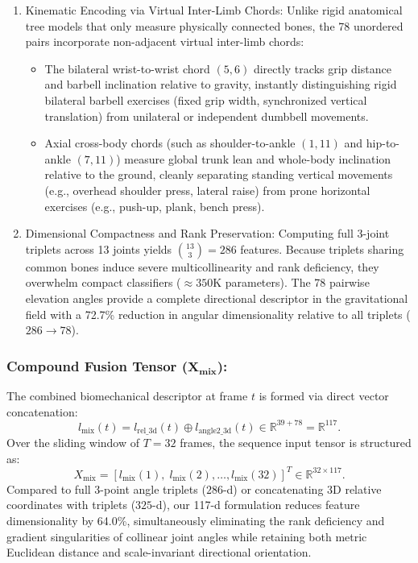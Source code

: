\documentclass[preprint,12pt]{elsarticle}
\begin{document}
\begin{enumerate}
    \item Kinematic Encoding via Virtual Inter-Limb Chords: 
    Unlike rigid anatomical tree models that only measure physically connected bones, the 78 unordered pairs incorporate non-adjacent virtual inter-limb chords:
    \begin{itemize}
        \item The bilateral wrist-to-wrist chord $(5, 6)$ directly tracks grip distance and barbell inclination relative to gravity, instantly distinguishing rigid bilateral barbell exercises (fixed grip width, synchronized vertical translation) from unilateral or independent dumbbell movements.
        \item Axial cross-body chords (such as shoulder-to-ankle $(1, 11)$ and hip-to-ankle $(7, 11)$) measure global trunk lean and whole-body inclination relative to the ground, cleanly separating standing vertical movements (e.g., overhead shoulder press, lateral raise) from prone horizontal exercises (e.g., push-up, plank, bench press).
    \end{itemize}

    \item Dimensional Compactness and Rank Preservation: Computing full 3-joint triplets across 13 joints yields $\binom{13}{3} = 286$ features. Because triplets sharing common bones induce severe multicollinearity and rank deficiency, they overwhelm compact classifiers ($\approx 350\text{K}$ parameters). The 78 pairwise elevation angles provide a complete directional descriptor in the gravitational field with a 72.7\% reduction in angular dimensionality relative to all triplets ($286 \to 78$).
\end{enumerate}

\subsubsection{Compound Fusion Tensor ($\mathbf{X_{\text{mix}}}$):}
The combined biomechanical descriptor at frame $t$ is formed via direct vector concatenation:
\begin{equation}
    l_{\text{mix}}(t) = l_{\text{rel\_3d}}(t) \oplus l_{\text{angle2\_3d}}(t) \in \mathbb{R}^{39 + 78} = \mathbb{R}^{117}.
\end{equation}
Over the sliding window of $T = 32$ frames, the sequence input tensor is structured as:
\begin{equation}
    X_{\text{mix}} = \left[ l_{\text{mix}}(1), \; l_{\text{mix}}(2), \dots, l_{\text{mix}}(32) \right]^T \in \mathbb{R}^{32 \times 117}.
\end{equation}
Compared to full 3-point angle triplets ($286$-d) or concatenating 3D relative coordinates with triplets ($325$-d), our 117-d formulation reduces feature dimensionality by 64.0\%, simultaneously eliminating the rank deficiency and gradient singularities of collinear joint angles while retaining both metric Euclidean distance and scale-invariant directional orientation.
\end{document}
